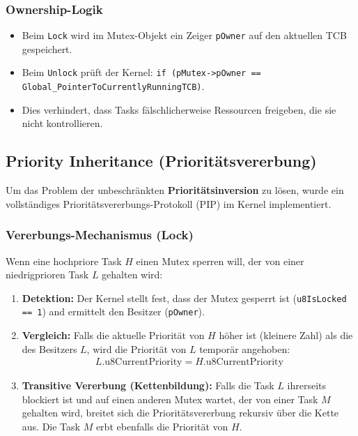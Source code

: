 \documentclass[11pt,a4paper]{article}
\begin{document}
\subsubsection{Ownership-Logik}
\begin{itemize}
    \item Beim \texttt{Lock} wird im Mutex-Objekt ein Zeiger \texttt{pOwner} auf den aktuellen TCB gespeichert.
    \item Beim \texttt{Unlock} prüft der Kernel: \texttt{if (pMutex->pOwner == Global\_PointerToCurrentlyRunningTCB)}.
    \item Dies verhindert, dass Tasks fälschlicherweise Ressourcen freigeben, die sie nicht kontrollieren.
\end{itemize}

\subsection{Priority Inheritance (Prioritätsvererbung)}
Um das Problem der unbeschränkten \textbf{Prioritätsinversion} zu lösen, wurde ein vollständiges Prioritätsvererbungs-Protokoll (PIP) im Kernel implementiert.

\subsubsection{Vererbungs-Mechanismus (Lock)}
Wenn eine hochpriore Task $H$ einen Mutex sperren will, der von einer niedrigprioren Task $L$ gehalten wird:
\begin{enumerate}
    \item \textbf{Detektion:} Der Kernel stellt fest, dass der Mutex gesperrt ist (\texttt{u8IsLocked == 1}) and ermittelt den Besitzer (\texttt{pOwner}).
    \item \textbf{Vergleich:} Falls die aktuelle Priorität von $H$ höher ist (kleinere Zahl) als die des Besitzers $L$, wird die Priorität von $L$ temporär angehoben:
    \begin{align*}
        L.\text{u8CurrentPriority} = H.\text{u8CurrentPriority}
    \end{align*}
    \item \textbf{Transitive Vererbung (Kettenbildung):} Falls die Task $L$ ihrerseits blockiert ist und auf einen anderen Mutex wartet, der von einer Task $M$ gehalten wird, breitet sich die Prioritätsvererbung rekursiv über die Kette aus. Die Task $M$ erbt ebenfalls die Priorität von $H$.
\end{enumerate}
\end{document}
